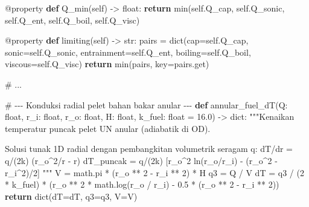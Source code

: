\documentclass[
  indonesian,
  12pt,
  a4paper,
]{report}
\newenvironment{Shaded}{\begin{snugshade}}{\end{snugshade}}
\newcommand{\AttributeTok}[1]{\textcolor[rgb]{0.40,0.45,0.13}{#1}}
\newcommand{\BuiltInTok}[1]{\textcolor[rgb]{0.00,0.23,0.31}{#1}}
\newcommand{\CommentTok}[1]{\textcolor[rgb]{0.37,0.37,0.37}{#1}}
\newcommand{\ControlFlowTok}[1]{\textcolor[rgb]{0.00,0.23,0.31}{\textbf{#1}}}
\newcommand{\DecValTok}[1]{\textcolor[rgb]{0.68,0.00,0.00}{#1}}
\newcommand{\FloatTok}[1]{\textcolor[rgb]{0.68,0.00,0.00}{#1}}
\newcommand{\KeywordTok}[1]{\textcolor[rgb]{0.00,0.23,0.31}{\textbf{#1}}}
\newcommand{\NormalTok}[1]{\textcolor[rgb]{0.00,0.23,0.31}{#1}}
\newcommand{\OperatorTok}[1]{\textcolor[rgb]{0.37,0.37,0.37}{#1}}
\newcommand{\VariableTok}[1]{\textcolor[rgb]{0.07,0.07,0.07}{#1}}
\begin{document}
\begin{Shaded}
\begin{Highlighting}[]
    \AttributeTok{@property}
    \KeywordTok{def}\NormalTok{ Q\_min(}\VariableTok{self}\NormalTok{) }\OperatorTok{{-}\textgreater{}} \BuiltInTok{float}\NormalTok{:}
        \ControlFlowTok{return} \BuiltInTok{min}\NormalTok{(}\VariableTok{self}\NormalTok{.Q\_cap, }\VariableTok{self}\NormalTok{.Q\_sonic, }\VariableTok{self}\NormalTok{.Q\_ent, }\VariableTok{self}\NormalTok{.Q\_boil, }\VariableTok{self}\NormalTok{.Q\_visc)}

    \AttributeTok{@property}
    \KeywordTok{def}\NormalTok{ limiting(}\VariableTok{self}\NormalTok{) }\OperatorTok{{-}\textgreater{}} \BuiltInTok{str}\NormalTok{:}
\NormalTok{        pairs }\OperatorTok{=} \BuiltInTok{dict}\NormalTok{(cap}\OperatorTok{=}\VariableTok{self}\NormalTok{.Q\_cap, sonic}\OperatorTok{=}\VariableTok{self}\NormalTok{.Q\_sonic, entrainment}\OperatorTok{=}\VariableTok{self}\NormalTok{.Q\_ent,}
\NormalTok{                     boiling}\OperatorTok{=}\VariableTok{self}\NormalTok{.Q\_boil, viscous}\OperatorTok{=}\VariableTok{self}\NormalTok{.Q\_visc)}
        \ControlFlowTok{return} \BuiltInTok{min}\NormalTok{(pairs, key}\OperatorTok{=}\NormalTok{pairs.get)}

\CommentTok{\# ...}

\CommentTok{\# {-}{-}{-} Konduksi radial pelet bahan bakar anular {-}{-}{-}}
\KeywordTok{def}\NormalTok{ annular\_fuel\_dT(Q: }\BuiltInTok{float}\NormalTok{, r\_i: }\BuiltInTok{float}\NormalTok{, r\_o: }\BuiltInTok{float}\NormalTok{, H: }\BuiltInTok{float}\NormalTok{,}
\NormalTok{                    k\_fuel: }\BuiltInTok{float} \OperatorTok{=} \FloatTok{16.0}\NormalTok{) }\OperatorTok{{-}\textgreater{}} \BuiltInTok{dict}\NormalTok{:}
    \CommentTok{"""Kenaikan temperatur puncak pelet UN anular (adiabatik di OD).}

\CommentTok{    Solusi tunak 1D radial dengan pembangkitan volumetrik seragam q\textquotesingle{}\textquotesingle{}\textquotesingle{}:}
\CommentTok{        dT/dr = q\textquotesingle{}\textquotesingle{}\textquotesingle{}/(2k) (r\_o\^{}2/r {-} r)}
\CommentTok{        dT\_puncak = q\textquotesingle{}\textquotesingle{}\textquotesingle{}/(2k) [r\_o\^{}2 ln(r\_o/r\_i) {-} (r\_o\^{}2 {-} r\_i\^{}2)/2]}
\CommentTok{    """}
\NormalTok{    V }\OperatorTok{=}\NormalTok{ math.pi }\OperatorTok{*}\NormalTok{ (r\_o }\OperatorTok{**} \DecValTok{2} \OperatorTok{{-}}\NormalTok{ r\_i }\OperatorTok{**} \DecValTok{2}\NormalTok{) }\OperatorTok{*}\NormalTok{ H}
\NormalTok{    q3 }\OperatorTok{=}\NormalTok{ Q }\OperatorTok{/}\NormalTok{ V}
\NormalTok{    dT }\OperatorTok{=}\NormalTok{ q3 }\OperatorTok{/}\NormalTok{ (}\DecValTok{2} \OperatorTok{*}\NormalTok{ k\_fuel) }\OperatorTok{*}\NormalTok{ (r\_o }\OperatorTok{**} \DecValTok{2} \OperatorTok{*}\NormalTok{ math.log(r\_o }\OperatorTok{/}\NormalTok{ r\_i)}
                              \OperatorTok{{-}} \FloatTok{0.5} \OperatorTok{*}\NormalTok{ (r\_o }\OperatorTok{**} \DecValTok{2} \OperatorTok{{-}}\NormalTok{ r\_i }\OperatorTok{**} \DecValTok{2}\NormalTok{))}
    \ControlFlowTok{return} \BuiltInTok{dict}\NormalTok{(dT}\OperatorTok{=}\NormalTok{dT, q3}\OperatorTok{=}\NormalTok{q3, V}\OperatorTok{=}\NormalTok{V)}



\end{Highlighting}
\end{Shaded}
\end{document}
